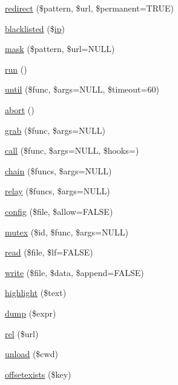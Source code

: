 \begin{DoxyCompactItemize}
\hyperlink{class_base_aabd48f745ba0f411f2a62460d5d10fba}{redirect} (\$pattern, \$url, \$permanent=T\+R\+UE)
\item 
\hyperlink{class_base_a3e27c86c02a50a6906d9d92337d7437d}{blacklisted} (\$\hyperlink{class_base_a197bae3714812901860bd006b00f91de}{ip})
\item 
\hyperlink{class_base_abc7b4470fe464baa2b35ec59e1a3ee3a}{mask} (\$pattern, \$url=N\+U\+LL)
\item 
\hyperlink{class_base_afb0fafe7e02a3ae1993c01c19fad2bae}{run} ()
\item 
\hyperlink{class_base_ac0839746f9fe00ea683310b3af59c671}{until} (\$func, \$args=N\+U\+LL, \$timeout=60)
\item 
\hyperlink{class_base_a0b3225a00a2350b06234860096d5178a}{abort} ()
\item 
\hyperlink{class_base_a669bbc5855d5fc5ff1959819fd8a987d}{grab} (\$func, \$args=N\+U\+LL)
\item 
\hyperlink{class_base_a58d9a02809fd387d8ed8ace64e10628e}{call} (\$func, \$args=N\+U\+LL, \$hooks=\textquotesingle{}\textquotesingle{})
\item 
\hyperlink{class_base_ab92ef3c41964ec3291278fefb47d16f5}{chain} (\$funcs, \$args=N\+U\+LL)
\item 
\hyperlink{class_base_aeae41eb437d4e24660a712e05240515d}{relay} (\$funcs, \$args=N\+U\+LL)
\item 
\hyperlink{class_base_a9b5adda44e6db1d1f45cf1e4a6be5ce1}{config} (\$file, \$allow=F\+A\+L\+SE)
\item 
\hyperlink{class_base_aee63f67e17f2fce3781b9199e98025fb}{mutex} (\$id, \$func, \$args=N\+U\+LL)
\item 
\hyperlink{class_base_a7dbce4917d643c341f1c072f484329c1}{read} (\$file, \$lf=F\+A\+L\+SE)
\item 
\hyperlink{class_base_afb51e542cbff9f00cc964ac9bd6eecb5}{write} (\$file, \$data, \$append=F\+A\+L\+SE)
\item 
\hyperlink{class_base_a9e02fb072a50fb8358713128b41ba417}{highlight} (\$text)
\item 
\hyperlink{class_base_a238c9a8c7839b0773ee92327c86d3438}{dump} (\$expr)
\item 
\hyperlink{class_base_a83965c040afee15a85c5085b56626d80}{rel} (\$url)
\item 
\hyperlink{class_base_adc7d192011936335400f5baffa3c2667}{unload} (\$cwd)
\item 
\hyperlink{class_base_a16da5af940f99a0df550a7f7c7c5d4e4}{offsetexists} (\$key)
\item 

\end{DoxyCompactItemize}
